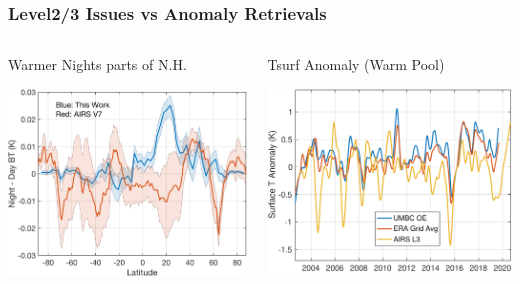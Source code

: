 \documentclass[10pt,t]{beamer}
\begin{document}
\begin{frame}
\frametitle{Level2/3 Issues vs Anomaly Retrievals}
\vspace{-0.2in}

\begin{columns}
\begin{column}{0.55\columnwidth}
\begin{block}{\footnotesize Warmer Nights parts of N.H.}
\vspace{-0.1in}
\begin{center}
\includegraphics[width=\linewidth]{./Figs21/desc_minus_asc_5pc_hot_bt_trend_with_airs_v7.png}
\end{center}
\end{block}
\end{column}


\begin{column}{0.5\columnwidth}
\begin{block}{\footnotesize Tsurf Anomaly (Warm Pool)}
\vspace{-0.05in}
\begin{center}
\includegraphics[width=\linewidth]{./Figs21/pro_tsurf_anom.pdf}
\end{center}
\end{block}
\end{column}
\end{columns}


\end{frame}
\end{document}
